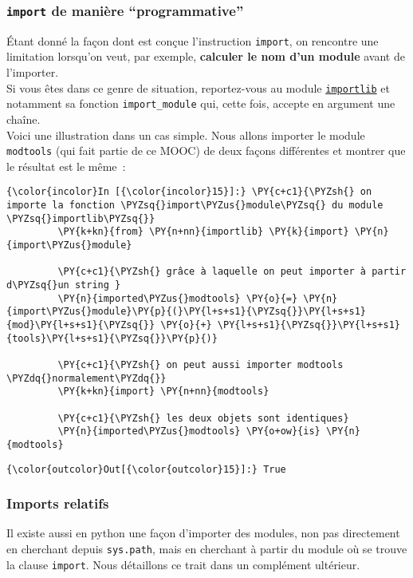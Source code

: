     \hypertarget{import-de-maniuxe8re-programmative}{%
\subsubsection{\texorpdfstring{\texttt{import} de manière
``programmative''}{import de manière ``programmative''}}\label{import-de-maniuxe8re-programmative}}

    Étant donné la façon dont est conçue l'instruction \texttt{import}, on
rencontre une limitation lorsqu'on veut, par exemple, \textbf{calculer
le nom d'un module} avant de l'importer.\\

Si vous êtes dans ce genre de situation, reportez-vous au module
\href{https://docs.python.org/3/library/importlib.html}{\texttt{importlib}}
et notamment sa fonction \texttt{import\_module} qui, cette fois,
accepte en argument une chaîne.\\

    Voici une illustration dans un cas simple. Nous allons importer le
module \texttt{modtools} (qui fait partie de ce MOOC) de deux façons
différentes et montrer que le résultat est le même~:

    \begin{Verbatim}[commandchars=\\\{\}]
{\color{incolor}In [{\color{incolor}15}]:} \PY{c+c1}{\PYZsh{} on importe la fonction \PYZsq{}import\PYZus{}module\PYZsq{} du module \PYZsq{}importlib\PYZsq{}}
         \PY{k+kn}{from} \PY{n+nn}{importlib} \PY{k}{import} \PY{n}{import\PYZus{}module}
         
         \PY{c+c1}{\PYZsh{} grâce à laquelle on peut importer à partir d\PYZsq{}un string }
         \PY{n}{imported\PYZus{}modtools} \PY{o}{=} \PY{n}{import\PYZus{}module}\PY{p}{(}\PY{l+s+s1}{\PYZsq{}}\PY{l+s+s1}{mod}\PY{l+s+s1}{\PYZsq{}} \PY{o}{+} \PY{l+s+s1}{\PYZsq{}}\PY{l+s+s1}{tools}\PY{l+s+s1}{\PYZsq{}}\PY{p}{)}
         
         \PY{c+c1}{\PYZsh{} on peut aussi importer modtools \PYZdq{}normalement\PYZdq{}}
         \PY{k+kn}{import} \PY{n+nn}{modtools}
         
         \PY{c+c1}{\PYZsh{} les deux objets sont identiques}
         \PY{n}{imported\PYZus{}modtools} \PY{o+ow}{is} \PY{n}{modtools}
\end{Verbatim}


\begin{Verbatim}[commandchars=\\\{\}]
{\color{outcolor}Out[{\color{outcolor}15}]:} True
\end{Verbatim}
            
    \hypertarget{imports-relatifs}{%
\subsubsection{Imports relatifs}\label{imports-relatifs}}

    Il existe aussi en python une façon d'importer des modules, non pas
directement en cherchant depuis \texttt{sys.path}, mais en cherchant à
partir du module où se trouve la clause \texttt{import}. Nous détaillons
ce trait dans un complément ultérieur.